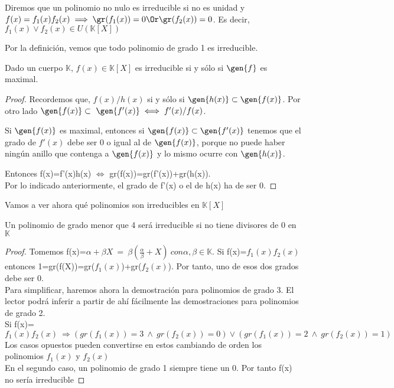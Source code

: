 \documentclass[nochap]{apuntes}
\begin{document}
\begin{defn}
 Diremos que un polinomio no nulo es irreducible si no es unidad y $f(x)=f_1(x)f_2(x) \implies \gr(f_1(x))=0 \Or  \gr(f_2(x))=0$. Es decir, $f_1(x) \vee f_2(x) \in U(\mathbb{K}[X])$
\end{defn}

Por la definición, vemos que todo polinomio de grado 1 es irreducible.

\begin{theorem}\label{thmMaximalIrreducibleK}
 Dado un cuerpo $\mathbb{K}$,  $f(x) \in \mathbb{K}[X]$  es irreducible si y sólo si $\gen{f}$ es maximal.
\end{theorem}

\begin{proof}
 Recordemos que, $f(x)/h(x)$ si y sólo si $\gen{h(x)} \subset \gen{f(x)}$. Por otro lado $\gen{f(x)} \subset \gen{f'(x)} \iff  f'(x)/f(x)$.
 
 Si $\gen{f(x)}$ es maximal, entonces si $\gen{f(x)} \subset \gen{f'(x)}$ tenemos que el grado de $f'(x)$ debe ser 0 o igual al de $\gen{f(x)}$, porque no puede haber ningún anillo que contenga a $\gen{f(x)}$ y lo mismo ocurre con $\gen{h(x)}$.
 
 Entonces f(x)=f'(x)h(x) $\Leftrightarrow$  gr(f(x))=gr(f'(x))+gr(h(x)).\\
 Por lo indicado anteriormente, el grado de f'(x) o el de h(x) ha de ser 0.
\end{proof}

Vamos a ver ahora qué polinomios son irreducibles en $\mathbb{K}[X]$\\
\begin{lemma}
 Un polinomio de grado menor que 4 será irreducible si no tiene divisores de 0 en $\mathbb{K}$
\end{lemma}
\begin{proof}
 Tomemos f(x)=$\alpha + \beta X \ = \ \beta(\frac{\alpha}{\beta}+X) \ con \alpha,\beta \in \mathbb{K}$. Si f(x)=$f_1(x)f_2(x)$  entonces 1=gr(f(X))=gr($f_1(x)$)+gr($f_2(x)$). Por tanto, uno de esos dos grados debe ser 0.\\
 
 Para simplificar, haremos ahora la demostración para polinomios de grado 3. El lector podrá inferir a partir de ahí fácilmente las demostraciones
 para polinomios de grado 2.\\
 Si f(x)=$f_1(x)f_2(x) \ \Rightarrow (gr(f_1(x))=3 \ \wedge \ gr(f_2(x))=0) \vee (gr(f_1(x))=2 \ \wedge \ gr(f_2(x))=1)$\\
 Los casos opuestos pueden convertirse en estos cambiando de orden los polinomios $f_1(x)$  y $f_2(x)$\\
 
 En el segundo caso, un polinomio de grado 1 siempre tiene un 0. Por tanto f(x) no sería irreducible
\end{proof}
\end{document}
